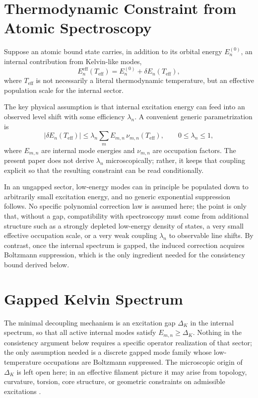 \documentclass[pdflatex,sn-mathphys-num]{sn-jnl}
\begin{document}
    \section{Thermodynamic Constraint from Atomic Spectroscopy}\label{sec:constraint}
        Suppose an atomic bound state carries, in addition to its orbital energy $E_n^{(0)}$, an internal contribution from Kelvin-like modes,
        \begin{equation}
            E_n^{\mathrm{eff}}(T_{\mathrm{eff}})
            =
            E_n^{(0)} + \delta E_n(T_{\mathrm{eff}}),
        \end{equation}
        where $T_{\mathrm{eff}}$ is not necessarily a literal thermodynamic temperature, but an effective population scale for the internal sector.

        The key physical assumption is that internal excitation energy can feed into an observed level shift with some efficiency $\lambda_n$. A convenient generic parametrization is
        \begin{equation}
            |\delta E_n(T_{\mathrm{eff}})|
            \le
            \lambda_n \sum_m E_{m,n}\, \nu_{m,n}(T_{\mathrm{eff}}),
            \qquad 0\le \lambda_n \le 1,
            \label{eq:generic_coupling_bound}
        \end{equation}
        where $E_{m,n}$ are internal mode energies and $\nu_{m,n}$ are occupation factors. The present paper does not derive $\lambda_n$ microscopically; rather, it keeps that coupling explicit so that the resulting constraint can be read conditionally.

        In an ungapped sector, low-energy modes can in principle be populated down to arbitrarily small excitation energy, and no generic exponential suppression follows. No specific polynomial correction law is assumed here; the point is only that, without a gap, compatibility with spectroscopy must come from additional structure such as a strongly depleted low-energy density of states, a very small effective occupation scale, or a very weak coupling $\lambda_n$ to observable line shifts. By contrast, once the internal spectrum is gapped, the induced correction acquires Boltzmann suppression, which is the only ingredient needed for the consistency bound derived below.

    \section{Gapped Kelvin Spectrum}\label{sec:gap}
        The minimal decoupling mechanism is an excitation gap $\Delta_K$ in the internal spectrum, so that all active internal modes satisfy $E_{m,n}\ge\Delta_K$. Nothing in the consistency argument below requires a specific operator realization of that sector; the only assumption needed is a discrete gapped mode family whose low-temperature occupations are Boltzmann suppressed. The microscopic origin of $\Delta_K$ is left open here; in an effective filament picture it may arise from topology, curvature, torsion, core structure, or geometric constraints on admissible excitations \cite{Ricca1996}.
\end{document}
